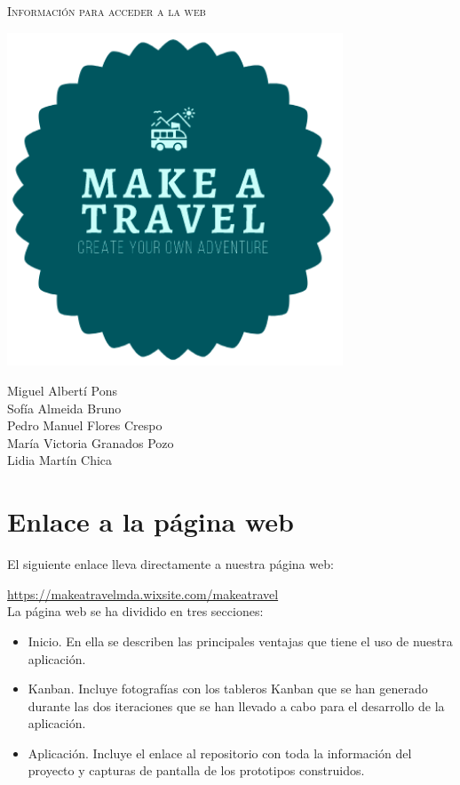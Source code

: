 \documentclass[11pt]{article}
\begin{document}
\begin{titlepage}
\centering
\vspace{4.5cm}
{\scshape\LARGE Información para acceder a la web \par}
\vspace{1.5cm}

\includegraphics[width=10cm]{Logo}

\vspace{3cm}
{\scshape\large \par}
\vspace{0.5cm}

{Miguel Albertí Pons\\
Sofía Almeida Bruno\\
Pedro Manuel Flores Crespo\\
María Victoria Granados Pozo\\
Lidia Martín Chica
\par}

\end{titlepage}
\newpage

\section{Enlace a la página web}
El siguiente enlace lleva directamente a nuestra página web: 

\url{https://makeatravelmda.wixsite.com/makeatravel} \\

La página web se ha dividido en tres secciones:
\begin{itemize}
\item Inicio. En ella se describen las principales ventajas que tiene el uso de nuestra aplicación.
\item Kanban. Incluye fotografías con los tableros Kanban que se han generado durante las dos iteraciones que se han llevado a cabo para el desarrollo de la aplicación.
\item Aplicación. Incluye el enlace al repositorio con toda la información del proyecto y capturas de pantalla de los prototipos construidos.
\end{itemize} 
\end{document}
